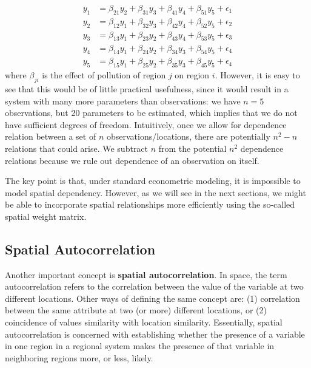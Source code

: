 \documentclass[english,12pt]{book}\usepackage[]{graphicx}\usepackage[]{xcolor}
\begin{document}
\begin{equation*}
  \begin{aligned}
y_1 & = \beta_{21} y_2 + \beta_{31} y_3 + \beta_{41} y_4 + \beta_{51} y_5 + \epsilon_1 \\
y_2 & = \beta_{12} y_1 + \beta_{32} y_3 + \beta_{42} y_4 + \beta_{52} y_5 + \epsilon_2 \\
y_3 & = \beta_{13} y_1 + \beta_{23} y_2 + \beta_{43} y_4 + \beta_{53} y_5 + \epsilon_3 \\
y_4 & = \beta_{14} y_1 + \beta_{24} y_2 + \beta_{34} y_3 + \beta_{54} y_5 + \epsilon_4 \\
y_5 & = \beta_{15} y_1 + \beta_{25} y_2 + \beta_{35} y_3 + \beta_{45} y_5 + \epsilon_4 
\end{aligned}
\end{equation*}
%
where $\beta_{ji}$ is the effect of pollution of region $j$ on region $i$. However, it is easy to see that  this would be of little practical usefulness, since it would result in a system with many more parameters than observations: we have $n = 5$ observations, but 20 parameters to be estimated, which implies that we do not have sufficient degrees of freedom. Intuitively, once we allow for dependence relation between a set of $n$ observations/locations, there are potentially $n^2-n$ relations that could arise. We subtract $n$ from the potential $n^2$ dependence relations because we rule out dependence of an observation on itself. 

The key point is that, under standard econometric modeling, it is impossible to model spatial dependency. However, as we will see in the next sections, we might be able to incorporate spatial relationships more efficiently using the so-called spatial weight matrix. 

\subsection{Spatial Autocorrelation}\label{sec:Spatial_autocorrelation}

Another important concept is \textbf{spatial autocorrelation}. In space, the term autocorrelation refers to the correlation between the value of the variable at two different locations. Other ways of defining the same concept are: (1) correlation between the same attribute at two (or more) different locations, or (2) coincidence of values similarity with location similarity. Essentially, spatial autocorrelation is concerned with establishing whether the presence of a variable in one region in a regional system makes the presence of that variable in neighboring regions more, or less, likely.
\end{document}
